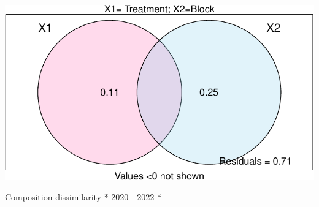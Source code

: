 \documentclass[
]{article}
\begin{document}
\includegraphics{log-project-aubrie-winnie_files/figure-latex/unnamed-chunk-6-2.pdf}

Composition dissimilarity * 2020 - 2022 *
\end{document}
